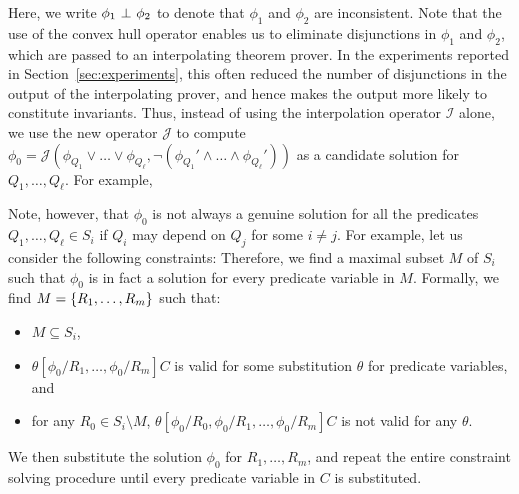 Here, we write \(\phi_1 \ \bot\  \phi_2\) to denote that \(\phi_1\) and 
\(\phi_2\) are inconsistent.  Note that the use of the convex hull 
operator enables us to eliminate disjunctions in \(\phi_1\) and 
\(\phi_2\), which are passed to an interpolating theorem prover.
In the experiments reported in Section~\ref{sec:experiments}, this often 
reduced the number of disjunctions in the output of the interpolating 
prover, and hence makes the output more likely to constitute invariants.
%
Thus, instead of using the interpolation operator \(\mathcal{I}\) alone, 
we use the new operator \(\mathcal{J}\) to compute \(\phi_0 = 
\mathcal{J}(\phi_{Q_1} \lor \dots \lor \phi_{Q_{\ell}},\neg (\phi_{Q_1}' 
\land \dots \land \phi_{Q_{\ell}}'))\) as a candidate solution for 
\(Q_1,\dots,Q_{\ell}\).  For example, \todo{}

Note, however, that \(\phi_0\) is not always a genuine solution for all 
the predicates \(Q_1,\dots,Q_{\ell} \in S_i\) if \(Q_i\) may depend on 
\(Q_j\) for some \(i \neq j\).  For example, let us consider the 
following constraints: \todo{}
Therefore, we find a maximal subset \(M\) of \(S_i\) such that \(\phi_0\) 
is in fact a solution for every predicate variable in \(M\).  Formally, 
we find \(M=\{{R_1,\dots,R_m}\}\) such that:
\begin{itemize}
\item \(M \subseteq S_i\),
\item \(\theta[\phi_0/R_1,\dots,\phi_0/R_m]C\) is valid for some 
substitution \(\theta\) for predicate variables, and
\item for any \(R_0 \in S_i \setminus M\), 
\(\theta[\phi_0/R_0,\phi_0/R_1,\dots,\phi_0/R_m]C\) is not valid for any 
\(\theta\).
\end{itemize}

We then substitute the solution \(\phi_0\) for \(R_1,\dots,R_m\), and 
repeat the entire constraint solving procedure until every predicate 
variable in \(C\) is substituted.    


%

